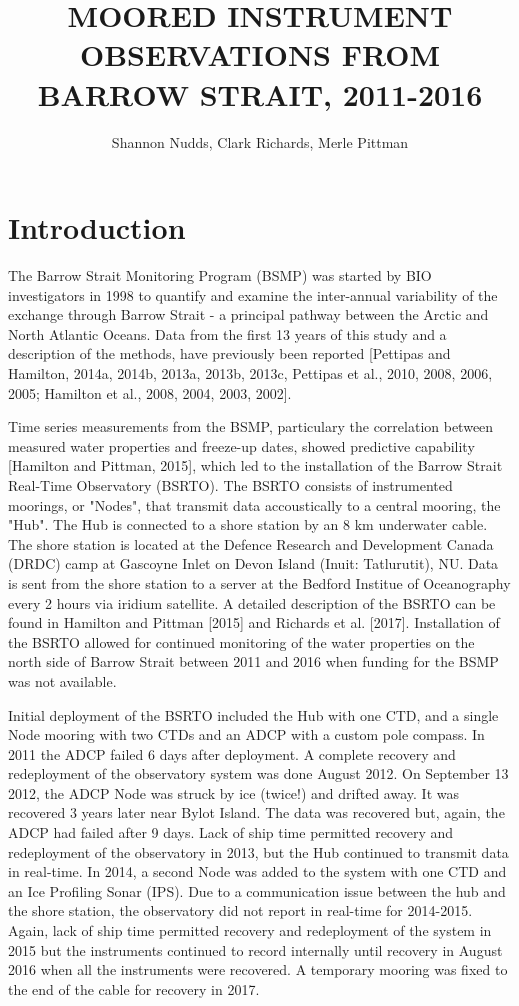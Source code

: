\documentclass[12pt]{dforeport}
\title{MOORED INSTRUMENT OBSERVATIONS FROM BARROW STRAIT, 2011-2016}
\author{Shannon Nudds, Clark Richards, Merle Pittman} %
\begin{document}

\frontmatter
\mainmatter
{} %
\fontsize{10}{12}\selectfont

\section{Introduction}

The Barrow Strait Monitoring Program (BSMP) was started by BIO investigators in 1998 to quantify and examine the inter-annual variability of the exchange through Barrow Strait - a principal pathway between the Arctic and North Atlantic Oceans. Data from the first 13 years of this study and a description of the methods, have previously been reported [Pettipas and Hamilton, 2014a, 2014b, 2013a, 2013b, 2013c, Pettipas et al., 2010, 2008, 2006, 2005; Hamilton et al., 2008, 2004, 2003, 2002]. 

Time series measurements from the BSMP, particulary the correlation between measured water properties and freeze-up dates, showed predictive capability [Hamilton and Pittman, 2015], which led to the installation of the Barrow Strait Real-Time Observatory (BSRTO). The BSRTO consists of instrumented moorings, or "Nodes", that transmit data accoustically to a central mooring, the "Hub". The Hub is connected to a shore station by an 8 km underwater cable. The shore station is located at the Defence Research and Development Canada (DRDC) camp at Gascoyne Inlet on Devon Island (Inuit: Tatlurutit), NU.  Data is sent from the shore station to a server at the Bedford Institue of Oceanography every 2 hours via iridium satellite. A detailed description of the BSRTO can be found in Hamilton and Pittman [2015] and Richards et al. [2017]. Installation of the BSRTO allowed for continued monitoring of the water properties on the north side of Barrow Strait between 2011 and 2016 when funding for the BSMP was not available. 

Initial deployment of the BSRTO included the Hub with one CTD, and a single Node mooring with two CTDs and an ADCP with a custom pole compass.  In 2011 the ADCP failed 6 days after deployment. A complete recovery and redeployment of the observatory system was done August 2012. On September 13 2012, the ADCP Node was struck by ice (twice!) and drifted away. It was recovered 3 years later near Bylot Island. The data was recovered but, again, the ADCP had failed after 9 days. Lack of ship time permitted recovery and redeployment of the observatory in 2013, but the Hub continued to transmit data in real-time. In 2014, a second Node was added to the system with one CTD and an Ice Profiling Sonar (IPS). Due to a communication issue between the hub and the shore station, the observatory did not report in real-time for 2014-2015. Again, lack of ship time permitted recovery and redeployment of the system in 2015 but the instruments continued to record internally until recovery in August 2016 when all the instruments were recovered. A temporary mooring was fixed to the end of the cable for recovery in 2017.
\end{document}

